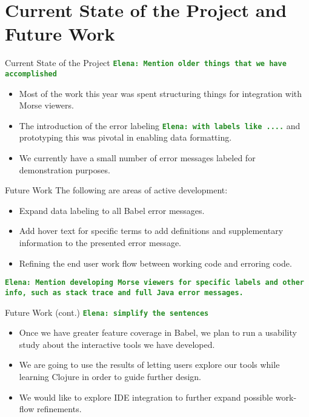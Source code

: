 \documentclass{beamer}
\newcommand{\comment}[1]{{\bf \tt  {#1}}}
\newcommand{\emcomment}[1]{\textcolor{ForestGreen}{\comment{Elena: {#1}}}}
\begin{document}
\section{Current State of the Project and Future Work}
\begin{frame}{Current State of the Project}
\emcomment{Mention older things that we have accomplished}
  \begin{itemize}
    \item<1-> Most of the work this year was spent structuring things for integration with Morse viewers.
    \item<2-> The introduction of the error labeling \emcomment{with labels like ....} and prototyping this was pivotal in enabling data formatting.
    \item<3-> We currently have a small number of error messages labeled for demonstration purposes.
  \end{itemize}
\end{frame}

\begin{frame}{Future Work}
  The following are areas of active development:
  \begin{itemize}
    \item<1-> Expand data labeling to all Babel error messages.
    \item<2-> Add hover text for specific terms to add definitions and supplementary information to the presented error message.
    \item<3-> Refining the end user work flow between working code and erroring code.
  \end{itemize}
\emcomment{Mention developing Morse viewers for specific labels and other info, such as stack trace and full Java error messages.}
  \end{frame}

\begin{frame}{Future Work (cont.)}
\emcomment{simplify the sentences}
  \begin{itemize}
    \item<1-> Once we have greater feature coverage in Babel, we plan to run a usability study about the interactive tools we have developed.
    \item<2-> We are going to use the results of letting users explore our tools while learning Clojure in order to guide further design. 
    \item<3-> We would like to explore IDE integration to further expand possible work-flow refinements.
  \end{itemize}
\end{frame}
\end{document}

